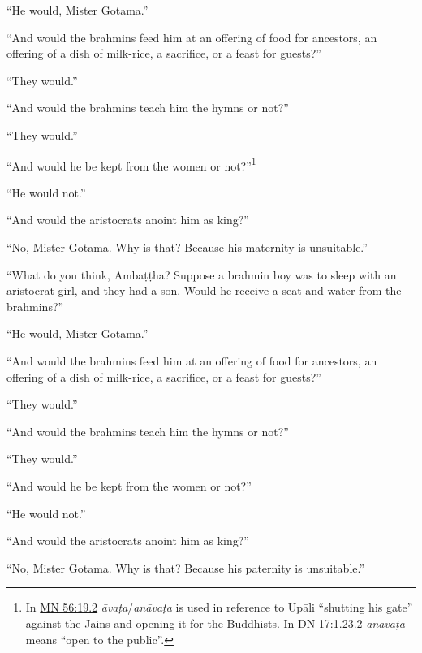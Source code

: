 \documentclass[12pt,openany]{book}%
\begin{document}
“He would, Mister Gotama.” 

“And would the brahmins feed him at an offering of food for ancestors, an offering of a dish of milk-rice, a sacrifice, or a feast for guests?” 

“They would.” 

“And would the brahmins teach him the hymns or not?” 

“They would.” 

“And would he be kept from the women or not?”\footnote{In \href{https://suttacentral.net/mn56/en/sujato\#19.2}{MN 56:19.2} \textit{\textsanskrit{āvaṭa}}/\textit{\textsanskrit{anāvaṭa}} is used in reference to \textsanskrit{Upāli} “shutting his gate” against the Jains and opening it for the Buddhists. In \href{https://suttacentral.net/dn17/en/sujato\#1.23.2}{DN 17:1.23.2} \textit{\textsanskrit{anāvaṭa}} means “open to the public”. } 

“He would not.” 

“And would the aristocrats anoint him as king?” 

“No, Mister Gotama. Why is that? Because his maternity is unsuitable.” 

“What do you think, \textsanskrit{Ambaṭṭha}? Suppose a brahmin boy was to sleep with an aristocrat girl, and they had a son. Would he receive a seat and water from the brahmins?” 

“He would, Mister Gotama.” 

“And would the brahmins feed him at an offering of food for ancestors, an offering of a dish of milk-rice, a sacrifice, or a feast for guests?” 

“They would.” 

“And would the brahmins teach him the hymns or not?” 

“They would.” 

“And would he be kept from the women or not?” 

“He would not.” 

“And would the aristocrats anoint him as king?” 

“No, Mister Gotama. Why is that? Because his paternity is unsuitable.” 
\end{document}
